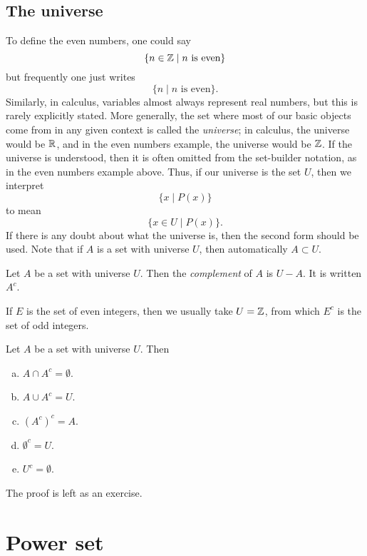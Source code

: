 \documentclass{tufte-book}
\begin{document}
\subsection{The universe}
\label{sec:universe}

To define the even numbers, one could say
\[
\{n \in \mathbb{Z}  \mid  n \text{ is even}\}
\]
but frequently one just writes
\[
\{n  \mid  n \text{ is even}\}.
\]
Similarly, in calculus, variables almost always represent real numbers, but this is rarely explicitly stated. More generally, the set where most of our basic objects come from in any given context is called the \emph{universe}; in calculus, the universe would be $\mathbb{R}$, and in the even numbers example, the universe would be $\mathbb{Z}$. If the universe is understood, then it is often omitted from the set-builder notation, as in the even numbers example above. Thus, if our universe is the set $U$, then we interpret
\[
\{x  \mid  P(x)\} 
\]
to mean
\[
\{x \in U  \mid  P(x)\}.
\]
If there is any doubt about what the universe is, then the second form should be used. Note that if $A$ is a set with universe $U$, then automatically $A \subset U$.

\begin{definition}
  Let $A$ be a set with universe $U$. Then the \emph{complement} of $A$ is $U - A$. It is written $A^c$.
\end{definition}

If $E$ is the set of even integers, then we usually take $U = \mathbb{Z}$, from which $E^c$ is the set of odd integers.

\begin{proposition}\label{prop:complements}
  Let $A$ be a set with universe $U$. Then
  \begin{enumerate}[(a)]
      \item $A \cap A^c = \emptyset$.
      \item $A \cup A^c = U$.
      \item $(A^c)^c = A$.
      \item $\emptyset^c = U$.
      \item $U^c = \emptyset$.
  \end{enumerate}
\end{proposition}

The proof is left as an exercise.



\section{Power set}
\label{sec:power-set}
\end{document}
